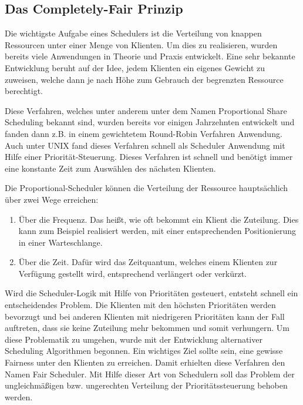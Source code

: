 \subsection{Das \glqq Completely-Fair\grqq{} Prinzip}\label{s:fair}
Die wichtigste Aufgabe eines Schedulers ist die Verteilung von knappen Ressourcen unter einer Menge von Klienten. 
Um dies zu realisieren, wurden bereits viele Anwendungen in Theorie und Praxis entwickelt.
Eine sehr bekannte Entwicklung beruht auf der Idee, jedem Klienten ein eigenes Gewicht zu zuweisen, welche dann je nach Höhe zum Gebrauch der begrenzten Ressource berechtigt.

Diese Verfahren, welches unter anderem unter dem Namen \glqq Proportional Share Scheduling\grqq{} bekannt sind, wurden bereits vor einigen Jahrzehnten entwickelt und fanden dann z.B. in einem gewichtetem Round-Robin Verfahren Anwendung. Auch unter UNIX fand dieses Verfahren schnell als Scheduler Anwendung mit Hilfe einer Priorität-Steuer\-ung. Dieses Verfahren ist schnell und benötigt immer eine konstante Zeit zum Auswählen des nächsten Klienten. 

Die Proportional-Scheduler können die Verteilung der Ressource hauptsächlich über zwei Wege erreichen:

\begin{enumerate}
	\item Über die Frequenz. Das heißt, wie oft bekommt ein Klient die Zuteilung. Dies kann zum Beispiel realisiert werden, mit einer entsprechenden Positionierung in einer Warteschlange.
	\item Über die Zeit. Dafür wird das Zeitquantum, welches einem Klienten zur Verfügung gestellt wird, entsprechend verlängert oder verkürzt.
\end{enumerate}

Wird die Scheduler-Logik mit Hilfe von Prioritäten gesteuert, entsteht schnell ein entscheidendes Problem. Die Klienten mit den höchsten Prioritäten werden bevorzugt und bei anderen Klienten mit niedrigeren Prioritäten kann der Fall auftreten, dass sie keine Zuteilung mehr bekommen und somit \glqq verhungern\grqq{}.
Um diese Problematik zu umgehen, wurde mit der Entwicklung alternativer Scheduling Algorithmen begonnen. Ein wichtiges Ziel sollte sein, eine gewisse Fairness unter den Klienten zu erreichen. Damit erhielten diese Verfahren den Namen \glqq Fair Scheduler\grqq{}. Mit Hilfe dieser Art von Schedulern soll das Problem der ungleichmäßigen bzw. ungerechten Verteilung der Prioritätssteuerung behoben werden.

